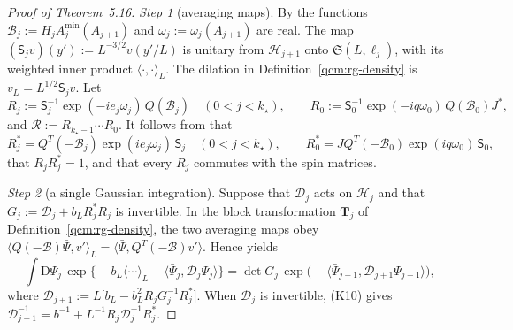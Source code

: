 \documentclass[11pt,letterpaper,reqno]{amsart}
\theoremstyle{definition}
\begin{document}
\begin{proof}[Proof of Theorem~5.16]
\emph{Step 1} (averaging maps).
By \cite[Proposition~10.1 and equation~(10.29)]{QEDConstruction} the functions $\mathscr B_j:=H_jA^{\min}_j(A_{j+1})$ and $\omega_j:=\omega_j(A_{j+1})$ are real.
The map $(\mathsf S_jv)(y'):=L^{-3/2}v(y'/L)$ is unitary from $\mathcal H_{j+1}$ onto $\mathfrak S(L,\ell_j)$, with its weighted inner product $\langle\cdot,\cdot\rangle_L$. The dilation in Definition~\ref{qcm:rg-density} is $v_L=L^{1/2}\mathsf S_jv$.
Let
\begin{equation*}
R_j:=\mathsf S_j^{-1}\exp(-ie_j\omega_j)\,Q(\mathscr B_j)\quad(0<j<k_\star),\qquad R_0:=\mathsf S_0^{-1}\exp(-iq\omega_0)\,Q(\mathscr B_0)J^*,
\end{equation*}
and $\mathcal R:=R_{k_\star-1}\cdots R_0$.
It follows from \cite[Section~11.2, equation~(11.8)]{QEDConstruction} that
\begin{equation*}
R_j^*=Q^T(-\mathscr B_j)\exp(ie_j\omega_j)\,\mathsf S_j\quad(0<j<k_\star),\qquad R_0^*=JQ^T(-\mathscr B_0)\exp(iq\omega_0)\,\mathsf S_0,
\end{equation*}
that $R_jR_j^*=1$, and that every $R_j$ commutes with the spin matrices.

\emph{Step 2} (a single Gaussian integration).
Suppose that $\mathcal D_j$ acts on $\mathcal H_j$ and that $G_j:=\mathcal D_j+b_LR_j^*R_j$ is invertible.
In the block transformation $\mathbf T_j$ of Definition~\ref{qcm:rg-density}, the two averaging maps obey $\langle Q(-\mathscr B)\bar\Psi,v'\rangle_L=\langle\bar\Psi,Q^T(-\mathscr B)v'\rangle$.
Hence \cite[Section~11.5, equation~(11.28)]{QEDConstruction} yields
\begin{equation*}
\int\mathrm D\Psi_j\,\exp\bigl\{-b_L\langle\cdots\rangle_L-\langle\bar\Psi_j,\mathcal D_j\Psi_j\rangle\bigr\}=\det G_j\,\exp\bigl(-\langle\bar\Psi_{j+1},\mathcal D_{j+1}\Psi_{j+1}\rangle\bigr),
\end{equation*}
where $\mathcal D_{j+1}:=L\bigl[b_L-b_L^2R_jG_j^{-1}R_j^*\bigr]$.
When $\mathcal D_j$ is invertible, (K10) gives $\mathcal D_{j+1}^{-1}=b^{-1}+L^{-1}R_j\mathcal D_j^{-1}R_j^*$.


\end{proof}
\end{document}
